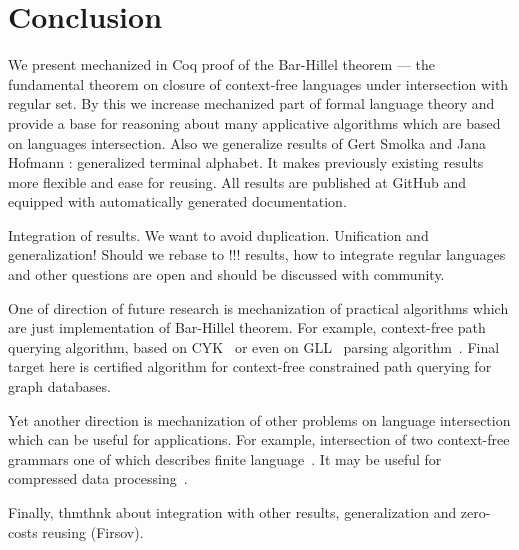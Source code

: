 \section{Conclusion}

We present mechanized in Coq proof of the Bar-Hillel theorem --- the fundamental theorem on closure of context-free languages under intersection with regular set.
By this we increase mechanized part of formal language theory and provide a base for reasoning about many applicative algorithms which are based on languages intersection.
Also we generalize results of Gert Smolka and Jana Hofmann : generalized terminal alphabet. 
It makes previously existing results more flexible and ease for reusing.
All results are published at GitHub and equipped with automatically generated documentation.

Integration of results. 
We want to avoid duplication.
Unification and generalization!
Should we rebase to !!! results, how to integrate regular languages and other questions are open and should be discussed with community.

One of direction of future research is mechanization of practical algorithms which are just implementation of Bar-Hillel theorem.
For example, context-free path querying algorithm, based on CYK~\cite{hellingsPathQuerying,zhang2016context} or even on GLL~\cite{scott2010gll} parsing algorithm~\cite{grigorev2016context}.
Final target here is certified algorithm for context-free constrained path querying for graph databases.

Yet another direction is mechanization of other problems on language intersection which can be useful for applications.
For example, intersection of two context-free grammars one of which describes finite language~\cite{nederhof2002parsing, nederhof2004language}.
It may be useful for compressed data processing~\cite{!!!}.

Finally, thmthnk about integration with other results, generalization and zero-costs reusing (Firsov).

